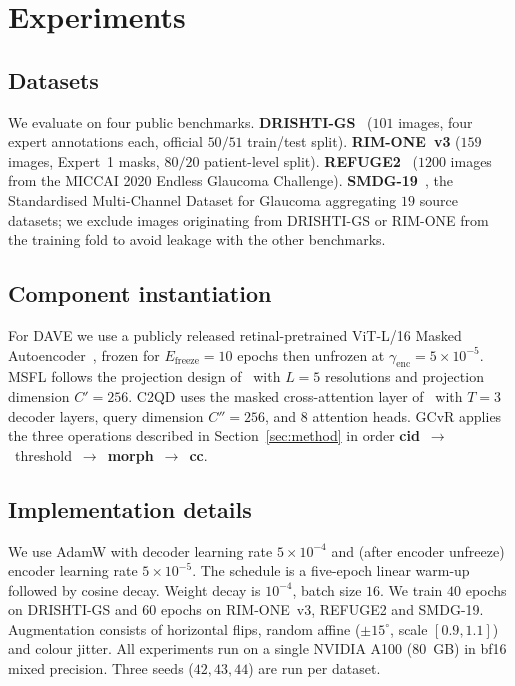 \documentclass[runningheads]{llncs}
\begin{document}
\section{Experiments}
\label{sec:experiments}

\subsection{Datasets}
We evaluate on four public benchmarks. \textbf{DRISHTI-GS}~\cite{sivaswamy2014drishti} ($101$ images, four expert annotations each, official $50/51$ train/test split). \textbf{RIM-ONE~v3} ($159$ images, Expert~1 masks, $80/20$ patient-level split). \textbf{REFUGE2}~\cite{refuge2_2020} ($1200$ images from the MICCAI 2020 Endless Glaucoma Challenge). \textbf{SMDG-19}~\cite{smdg19_2023}, the Standardised Multi-Channel Dataset for Glaucoma aggregating $19$ source datasets; we exclude images originating from DRISHTI-GS or RIM-ONE from the training fold to avoid leakage with the other benchmarks.

\subsection{Component instantiation}
For DAVE we use a publicly released retinal-pretrained ViT-L/16 Masked Autoencoder~\cite{retfound2023nature}, frozen for $E_\text{freeze}=10$ epochs then unfrozen at $\gamma_\text{enc}=5\!\times\!10^{-5}$. MSFL follows the projection design of~\cite{dinounet2025} with $L=5$ resolutions and projection dimension $C'=256$. C2QD uses the masked cross-attention layer of~\cite{cheng2022mask2former} with $T=3$ decoder layers, query dimension $C''=256$, and $8$ attention heads. GCvR applies the three operations described in Section~\ref{sec:method} in order \textbf{cid}~$\to$~threshold~$\to$~\textbf{morph}~$\to$~\textbf{cc}.

\subsection{Implementation details}
We use AdamW with decoder learning rate $5\!\times\!10^{-4}$ and (after encoder unfreeze) encoder learning rate $5\!\times\!10^{-5}$. The schedule is a five-epoch linear warm-up followed by cosine decay. Weight decay is $10^{-4}$, batch size $16$. We train $40$ epochs on DRISHTI-GS and $60$ epochs on RIM-ONE~v3, REFUGE2 and SMDG-19. Augmentation consists of horizontal flips, random affine ($\pm 15^\circ$, scale $[0.9, 1.1]$) and colour jitter. All experiments run on a single NVIDIA A100 ($80$~GB) in bf16 mixed precision. Three seeds ($42, 43, 44$) are run per dataset.
\end{document}
